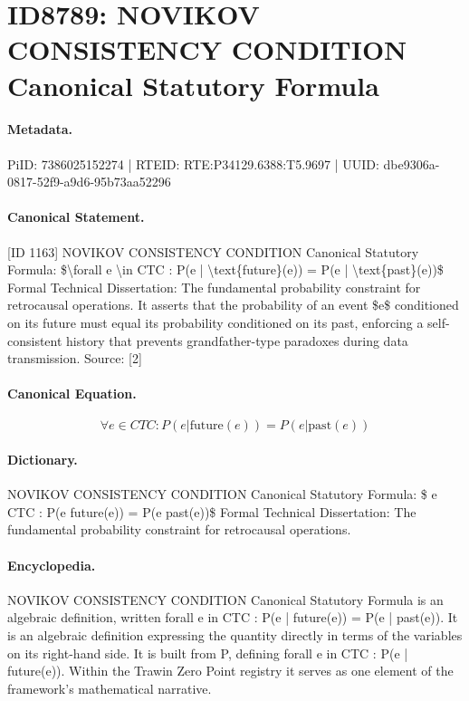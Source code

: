\section*{ID8789: NOVIKOV CONSISTENCY CONDITION Canonical Statutory Formula}
\paragraph{Metadata.}
PiID: 7386025152274 | RTEID: RTE:P34129.6388:T5.9697 | UUID: dbe9306a-0817-52f9-a9d6-95b73aa52296

\paragraph{Canonical Statement.}
[ID 1163] NOVIKOV CONSISTENCY CONDITION Canonical Statutory Formula: \$\textbackslash{}forall e \textbackslash{}in CTC : P(e | \textbackslash{}text\{future\}(e)) = P(e | \textbackslash{}text\{past\}(e))\$ Formal Technical Dissertation: The fundamental probability constraint for retrocausal operations. It asserts that the probability of an event \$e\$ conditioned on its future must equal its probability conditioned on its past, enforcing a self-consistent history that prevents grandfather-type paradoxes during data transmission. Source: [2]

\paragraph{Canonical Equation.}
\[
\forall e \in CTC : P(e | \text{future}(e)) = P(e | \text{past}(e))
\]

\paragraph{Dictionary.}
NOVIKOV CONSISTENCY CONDITION Canonical Statutory Formula: \$ e CTC : P(e future(e)) = P(e past(e))\$ Formal Technical Dissertation: The fundamental probability constraint for retrocausal operations.

\paragraph{Encyclopedia.}
NOVIKOV CONSISTENCY CONDITION Canonical Statutory Formula is an algebraic definition, written forall e in CTC : P(e | future(e)) = P(e | past(e)). It is an algebraic definition expressing the quantity directly in terms of the variables on its right-hand side. It is built from P, defining forall e in CTC : P(e | future(e)). Within the Trawin Zero Point registry it serves as one element of the framework's mathematical narrative.

